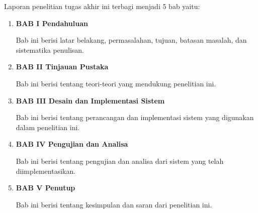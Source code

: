Laporan penelitian tugas akhir ini terbagi menjadi 5 bab yaitu:

\begin{enumerate}[nolistsep]

  \item \textbf{BAB I Pendahuluan}

        Bab ini berisi latar belakang, permasalahan, tujuan, batasan masalah, dan sistematika penulisan.

        \vspace{2ex}

  \item \textbf{BAB II Tinjauan Pustaka}

        Bab ini berisi tentang teori-teori yang mendukung penelitian ini.

        \vspace{2ex}

  \item \textbf{BAB III Desain dan Implementasi Sistem}

        Bab ini berisi tentang perancangan dan implementasi sistem yang digunakan dalam penelitian ini.

        \vspace{2ex}

  \item \textbf{BAB IV Pengujian dan Analisa}

        Bab ini berisi tentang pengujian dan analisa dari sistem yang telah diimplementasikan.

        \vspace{2ex}

  \item \textbf{BAB V Penutup}

        Bab ini berisi tentang kesimpulan dan saran dari penelitian ini.

\end{enumerate}